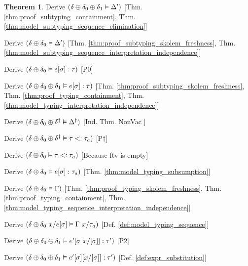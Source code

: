 \documentclass[acmsmall]{acmart}
\theoremstyle{definition}
\newtheorem{theorem}{Theorem}[section]
\begin{document}
\begin{theorem}
  \item \I\I \N Derive $(
    \delta \oplus \delta_0 \oplus \delta_1 \vDash \Delta'
  )$ [Thm. \ref{thm:proof_subtyping_containment}, Thm. \ref{thm:model_subtyping_sequence_elimination}]
  \item \I\I \N Derive $(
    \delta \oplus \delta_0 \vDash \Delta'
  )$ [Thm. \ref{thm:proof_subtyping_skolem_freshness}, Thm. \ref{thm:model_subtyping_sequence_interpretation_independence}]
  \item \I\I \N Derive $(
    \delta \oplus \delta_0 \vDash e[\sigma] : \tau
  )$ [P0]
  \item \I\I \N Derive $(
    \delta \oplus \delta_0 \oplus \delta_1 \vDash e[\sigma] : \tau
  )$ [Thm. \ref{thm:proof_subtyping_skolem_freshness}, 
      Thm. \ref{thm:proof_typing_containment},
      Thm. \ref{thm:model_typing_interpretation_independence}]

  \item \I\I \N Derive $(
    \delta \oplus \delta_0 \oplus \delta^\dagger \vDash \Delta^\dagger
  )$ [Ind. Thm. NonVac ]

  \item \I\I \N Derive $(
    \delta \oplus \delta_0 \oplus \delta^\dagger \vDash \tau <: \tau_a
  )$ [P$\dagger$]

  \item \I\I \N Derive $(
    \delta \oplus \delta_0 \vDash \tau <: \tau_a
  )$ [Because ftv is empty]

  \item \I\I \N Derive $(
    \delta \oplus \delta_0 \vDash e[\sigma] : \tau_a
  )$ [Thm. \ref{thm:model_typing_subsumption}]

  \item \I\I \N Derive $(
    \delta \oplus \delta_0 \vDash \Gamma
  )$ [Thm. \ref{thm:proof_typing_skolem_freshness},
      Thm. \ref{thm:proof_typing_containment},
      Thm. \ref{thm:model_typing_sequence_interpretation_independence}]

  \item \I\I \N Derive $(
    \delta \oplus \delta_0\ x \slash e[\sigma] \vDash \Gamma\ x \slash \tau_a
  )$ [Def. \ref{def:model_typing_sequence}]

  \item \I\I \N Derive $(
    \delta \oplus \delta_0 \oplus \delta_1 \satisfies e'[\sigma\ x\slash[\sigma]] \hastype \tau'
  )$ [P2]

  \item \I\I \N Derive $(
    \delta \oplus \delta_0 \oplus \delta_1 \vDash e'[\sigma][x\slash[\sigma]] : \tau'
  )$ [Def. \ref{def:expr_substitution}]


\end{theorem}
\end{document}
